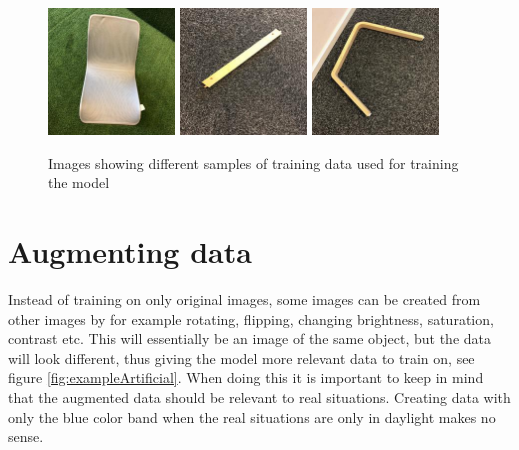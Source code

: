 \begin{figure}[hbtp]
\begin{center}
\includegraphics[width = 0.3\textwidth]{./Images/image_31.jpg}
\includegraphics[width = 0.3\textwidth]{./Images/image_133.jpg}
\includegraphics[width = 0.3\textwidth]{./Images/image_136.jpg}
\caption{Images showing different samples of training data used for training the model}
\label{fig:exampleData}
\end{center}
\end{figure}

\section{Augmenting data}
\label{sec:NNaugment}
Instead of training on only original images, some images can be created from other images by for example rotating, flipping, changing brightness, saturation, contrast etc.  This will essentially be an image of the same object, but the data will look different, thus giving the model more relevant data to train on, see figure \ref{fig:exampleArtificial}.
When doing this it is important to keep in mind that the augmented data should be relevant to real situations.
Creating data with only the blue color band when the real situations are only in daylight makes no sense.

